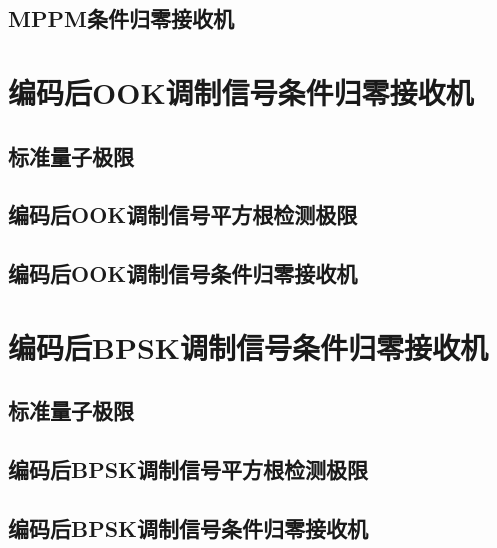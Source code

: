 \subsection{MPPM条件归零接收机}


\section{编码后OOK调制信号条件归零接收机}
\subsection{标准量子极限}

\subsection{编码后OOK调制信号平方根检测极限}

\subsection{编码后OOK调制信号条件归零接收机}



\section{编码后BPSK调制信号条件归零接收机}
\subsection{标准量子极限}

\subsection{编码后BPSK调制信号平方根检测极限}

\subsection{编码后BPSK调制信号条件归零接收机}



